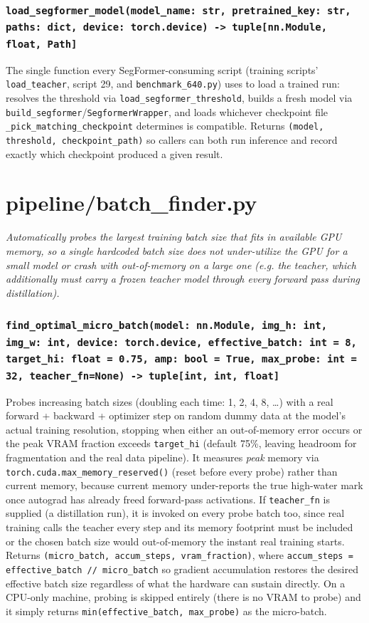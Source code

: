 \documentclass[11pt]{article}
\newcommand{\role}[1]{\par\noindent\textit{#1}\par\vspace{0.5em}}
\newcommand{\func}[1]{\subsubsection*{\texttt{#1}}}
\begin{document}
\func{load\_segformer\_model(model\_name: str, pretrained\_key: str, paths: dict, device: torch.device) -> tuple[nn.Module, float, Path]}
The single function every SegFormer-consuming script (training scripts'
\texttt{load\_teacher}, script 29, and \texttt{benchmark\_640.py}) uses to load a
trained run: resolves the threshold via \texttt{load\_segformer\_threshold},
builds a fresh model via \texttt{build\_segformer}/\texttt{SegformerWrapper}, and
loads whichever checkpoint file \texttt{\_pick\_matching\_checkpoint} determines
is compatible. Returns \texttt{(model, threshold, checkpoint\_path)} so callers
can both run inference and record exactly which checkpoint produced a given
result.

\newpage
\section{pipeline/batch\_finder.py}
\role{Automatically probes the largest training batch size that fits in
available GPU memory, so a single hardcoded batch size does not under-utilize
the GPU for a small model or crash with out-of-memory on a large one (e.g. the
teacher, which additionally must carry a frozen teacher model through every
forward pass during distillation).}

\func{find\_optimal\_micro\_batch(model: nn.Module, img\_h: int, img\_w: int, device: torch.device, effective\_batch: int = 8, target\_hi: float = 0.75, amp: bool = True, max\_probe: int = 32, teacher\_fn=None) -> tuple[int, int, float]}
Probes increasing batch sizes (doubling each time: 1, 2, 4, 8, \ldots) with a
real forward + backward + optimizer step on random dummy data at the model's
actual training resolution, stopping when either an out-of-memory error occurs
or the peak VRAM fraction exceeds \texttt{target\_hi} (default 75\%, leaving
headroom for fragmentation and the real data pipeline). It measures \emph{peak}
memory via \texttt{torch.cuda.max\_memory\_reserved()} (reset before every
probe) rather than current memory, because current memory under-reports the
true high-water mark once autograd has already freed forward-pass activations.
If \texttt{teacher\_fn} is supplied (a distillation run), it is invoked on every
probe batch too, since real training calls the teacher every step and its
memory footprint must be included or the chosen batch size would
out-of-memory the instant real training starts. Returns
\texttt{(micro\_batch, accum\_steps, vram\_fraction)}, where
\texttt{accum\_steps = effective\_batch // micro\_batch} so gradient
accumulation restores the desired effective batch size regardless of what the
hardware can sustain directly. On a CPU-only machine, probing is skipped
entirely (there is no VRAM to probe) and it simply returns
\texttt{min(effective\_batch, max\_probe)} as the micro-batch.
\end{document}
